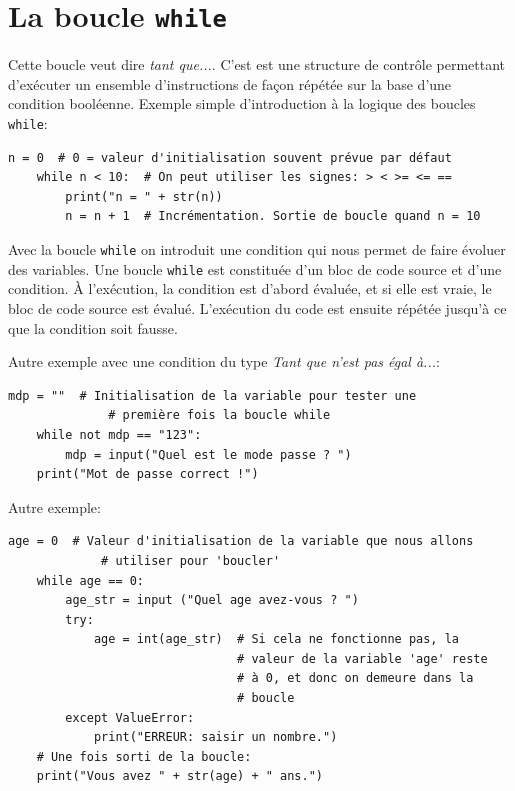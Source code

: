 \documentclass[a4paper,12pt]{book}
\begin{document}
\chapter{La boucle \texttt{while}}
Cette boucle veut dire \textit{tant que...}. C'est est une structure de contrôle permettant d'exécuter un ensemble d'instructions de façon répétée sur la base d'une condition booléenne. Exemple simple d'introduction à la logique des boucles \texttt{while}:
\begin{lstlisting}[caption=Premier exemple avec la boucle \textit{while}]
    n = 0  # 0 = valeur d'initialisation souvent prévue par défaut
    while n < 10:  # On peut utiliser les signes: > < >= <= ==
        print("n = " + str(n))
        n = n + 1  # Incrémentation. Sortie de boucle quand n = 10
\end{lstlisting}
\medskip

Avec la boucle \texttt{while} on introduit une condition qui nous permet de faire évoluer des variables. Une boucle \texttt{while} est constituée d’un bloc de code source et d’une condition. À l’exécution, la condition est d’abord évaluée, et si elle est vraie, le bloc de code source est évalué. L'exécution du code est ensuite répétée jusqu’à ce que la condition soit fausse. 
\medskip

Autre exemple avec une condition du type \textit{Tant que n'est pas égal à...}:
\begin{lstlisting}[caption=Deuxième exemple avec la boucle \textit{while}]
    mdp = ""  # Initialisation de la variable pour tester une
              # première fois la boucle while
    while not mdp == "123":
        mdp = input("Quel est le mode passe ? ")
    print("Mot de passe correct !")
\end{lstlisting}
\medskip

Autre exemple:
\begin{lstlisting}[caption=Troisième exemple avec la boucle \textit{while}]
    age = 0  # Valeur d'initialisation de la variable que nous allons  
             # utiliser pour 'boucler'
    while age == 0:
        age_str = input ("Quel age avez-vous ? ")
        try: 
            age = int(age_str)  # Si cela ne fonctionne pas, la  
                                # valeur de la variable 'age' reste  
                                # à 0, et donc on demeure dans la
                                # boucle
        except ValueError:
            print("ERREUR: saisir un nombre.")
    # Une fois sorti de la boucle:
    print("Vous avez " + str(age) + " ans.")  
\end{lstlisting}
\medskip
\end{document}
